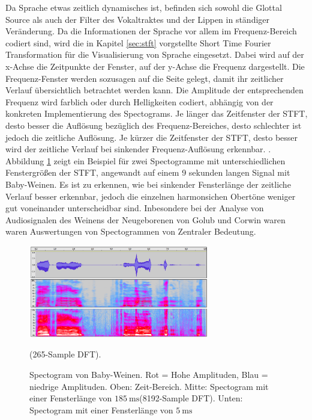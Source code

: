 Da Sprache etwas zeitlich dynamisches ist, befinden sich sowohl die Glottal Source als auch der Filter des Vokaltraktes und der Lippen in ständiger Veränderung. Da die Informationen der Sprache vor allem im Frequenz-Bereich codiert sind, wird die in Kapitel \ref{sec:stft} vorgstellte Short Time Fourier Transformation für die Visualisierung von Sprache eingesetzt. Dabei wird auf der x-Achse die Zeitpunkte der Fenster, auf der y-Achse die Frequenz dargestellt. Die Frequenz-Fenster werden sozusagen \glqq auf die Seite gelegt\grqq{}, damit ihr zeitlicher Verlauf übersichtlich betrachtet werden kann. Die Amplitude der entsprechenden Frequenz wird farblich oder durch Helligkeiten codiert, abhängig von der konkreten Implementierung des Spectograms. Je länger das Zeitfenster der STFT, desto besser die Auflösung bezüglich des Frequenz-Bereiches, desto schlechter ist jedoch  die zeitliche Auflösung. Je kürzer die Zeitfenster der STFT, desto besser wird der zeitliche Verlauf bei sinkender Frequenz-Auflösung erkennbar.\cite[S. 48 - 50]{sprachverarbeitung} \cite[Acoustic Representations of Speech]{speechAcoustics}. Abbildung \ref{img:spectoExample} zeigt ein Beispiel für zwei Spectogramme mit unterschiedlichen Fenstergrößen der STFT, angewandt auf einem 9 sekunden langen Signal mit Baby-Weinen. Es ist zu erkennen, wie bei sinkender Fensterlänge der zeitliche Verlauf besser erkennbar, jedoch die einzelnen harmonsichen Obertöne weniger gut voneinander unterscheidbar sind. Inbesondere bei der Analyse von Audiosignalen des Weinens der Neugeborenen von Golub und Corwin waren \cite{cryModel} waren Auswertungen von Spectogrammen von Zentraler Bedeutung.

\begin{figure}[h]
	\centering
	\includegraphics[width=0.7\textwidth]{bilder/spectogram03.png}
	\caption{Spectogram von Baby-Weinen. Rot = Hohe Amplituden, Blau = niedrige Amplituden. Oben: Zeit-Bereich. Mitte: Spectogram mit einer Fensterlänge von $\SI{185}{\milli\second}$(8192-Sample DFT). Unten: Spectogram mit einer Fensterlänge von $\SI{5}{\milli\second}$} (265-Sample DFT).
	\label{img:spectoExample}
\end{figure}	


